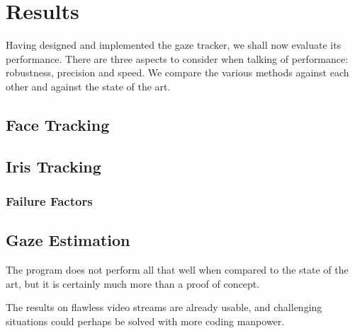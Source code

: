 \chapter{Results}

Having designed and implemented the gaze tracker, we shall now evaluate its performance.
There are three aspects to consider when talking of performance: robustness, precision and speed.
We compare the various methods against each other and against the state of the art.

\section{Face Tracking}


\section{Iris Tracking}

\subsection{Failure Factors}

\section{Gaze Estimation}

The program does not perform all that well when compared to the state of the art, but it is certainly much more than a proof of concept.

The results on flawless video streams are already usable, and challenging situations could perhaps be solved with more coding manpower.
\todo{\dots}
